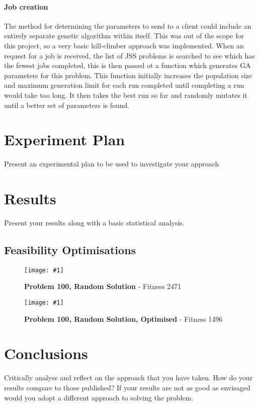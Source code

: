 \documentclass[14pt]{acmsiggraph}
\newcommand{\figuremacroW}[4]{
	\begin{figure}[h] %
		\centering
		\texttt{[image: \#1]}
		\caption[#2]{\textbf{#2} - #3}
		\label{fig:#1}
	\end{figure}
}
\begin{document}
\paragraph{Job creation}
The method for determining the parameters to send to a client could include an entirely separate genetic algorithm within itself. This was out of the scope for this project, so a very basic hill-climber approach was implemented. When an request for a job is received, the list of JSS problems is searched to see which has the fewest jobs completed, this is then passed ot a function which generates GA parameters for this problem. This function initially increases the population size and maximum generation limit for each run completed until completing a run would take too long. It then takes the best run so far and randomly mutates it until a better set of parameters is found.




\section{Experiment Plan}
Present an experimental plan to be used to investigate your approach



\section{Results}
Present your results along with a basic statistical analysis.

\subsection{Feasibility Optimisations}
\figuremacroW
{p100rnd}
{Problem 100, Random Solution}
{Fitness 2471}
{1.0}
\figuremacroW
{p100rndopt}
{Problem 100, Random Solution, Optimised}
{Fitness 1496}
{1.0}

\section{Conclusions}
Critically analyse and reflect on the approach that you have taken. How do your results compare to those published? If your results are not as good as envisaged would you adopt a different approach to solving the problem.




\end{document}
